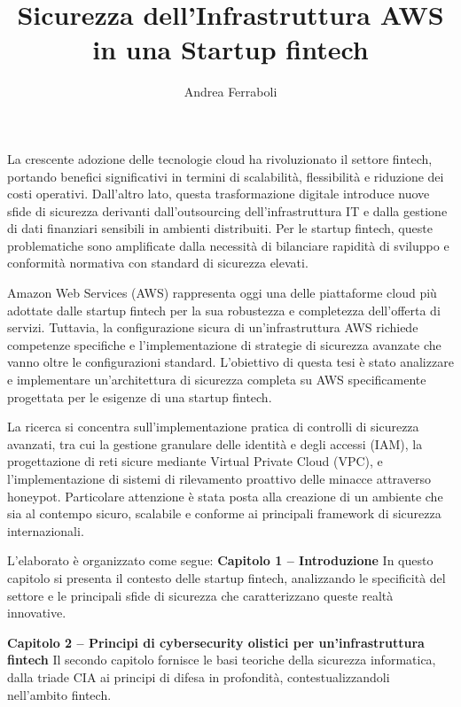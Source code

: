 \documentclass[a4paper,12pt]{report}
\begin{document}
\title{Sicurezza dell'Infrastruttura AWS in una Startup fintech}
\author{Andrea Ferraboli}

\maketitlepage
{}
La crescente adozione delle tecnologie cloud ha rivoluzionato il settore fintech, 
portando benefici significativi in termini di scalabilità, flessibilità e riduzione 
dei costi operativi. Dall'altro lato, questa trasformazione digitale introduce 
nuove sfide di sicurezza derivanti dall'outsourcing dell'infrastruttura IT e dalla 
gestione di dati finanziari sensibili in ambienti distribuiti. Per le startup fintech, 
queste problematiche sono amplificate dalla necessità di bilanciare rapidità di 
sviluppo e conformità normativa con standard di sicurezza elevati.

Amazon Web Services (AWS) rappresenta oggi una delle piattaforme cloud più 
adottate dalle startup fintech per la sua robustezza e completezza dell'offerta di 
servizi. Tuttavia, la configurazione sicura di un'infrastruttura AWS richiede competenze 
specifiche e l'implementazione di strategie di sicurezza avanzate che vanno oltre 
le configurazioni standard. L'obiettivo di questa tesi è stato analizzare e implementare 
un'architettura di sicurezza completa su AWS specificamente progettata per le 
esigenze di una startup fintech.

La ricerca si concentra sull'implementazione pratica di controlli di sicurezza 
avanzati, tra cui la gestione granulare delle identità e degli accessi (IAM), la 
progettazione di reti sicure mediante Virtual Private Cloud (VPC), e l'implementazione 
di sistemi di rilevamento proattivo delle minacce attraverso honeypot. Particolare 
attenzione è stata posta alla creazione di un ambiente che sia al contempo sicuro, 
scalabile e conforme ai principali framework di sicurezza internazionali.

L'elaborato è organizzato come segue:
\newline
\textbf{Capitolo 1 – Introduzione} In questo capitolo si presenta il contesto delle 
startup fintech, analizzando le specificità del settore e le principali sfide 
di sicurezza che caratterizzano queste realtà innovative.

\textbf{Capitolo 2 – Principi di cybersecurity olistici per un'infrastruttura fintech} 
Il secondo capitolo fornisce le basi teoriche della sicurezza informatica, 
dalla triade CIA ai principi di difesa in profondità, contestualizzandoli 
nell'ambito fintech.
\end{document}
